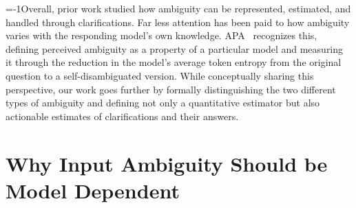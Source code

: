 \looseness=-1Overall, prior work studied how ambiguity can be represented, estimated, and handled through clarifications. Far less attention has been paid to how ambiguity varies with the responding model's own knowledge. APA~\citep{kim-etal-2024-aligning} recognizes this, defining perceived ambiguity as a property of a particular model and measuring it through the reduction in the model's average token entropy from the original question to a self-disambiguated version.
While conceptually sharing this perspective, our work goes further by formally distinguishing the two different types of ambiguity and defining not only a quantitative estimator but also actionable estimates of clarifications and their answers.





\section{Why Input Ambiguity Should be Model Dependent}
\label{sec:motivation}

